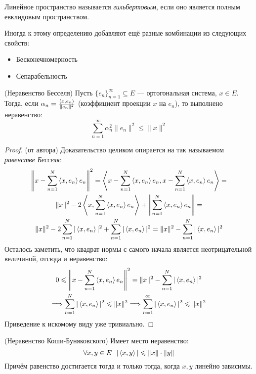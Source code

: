 \begin{definition}
	Линейное пространство называется \textit{гильбертовым}, если оно является полным евклидовым пространством.
\end{definition}

\begin{note}
	Иногда к этому определению добавляют ещё разные комбинации из следующих свойств:
	\begin{itemize}
		\item Бесконечномерность
		
		\item Сепарабельность
	\end{itemize}
\end{note}

\begin{reminder} (Неравенство Бесселя)
	Пусть $\{e_n\}_{n = 1}^\infty \subseteq E$ --- ортогональная система, $x \in E$. Тогда, если $\alpha_n = \frac{\left\langle x, e_n\right\rangle}{\|e_n\|^2}$ (коэффициент проекции $x$ на $e_n$), то выполнено неравенство:
	\[
		\sum_{n = 1}^\infty \alpha_n^2\|e_n\|^2 \le \|x\|^2
	\]
\end{reminder}

\begin{proof} (от автора)
	Доказательство целиком опирается на так называемом \textit{равенстве Бесселя}:
	\begin{multline*}
		\left\|x - \sum_{n = 1}^N \left\langle x, e_n\right\rangle e_n\right\|^2 = \left\langle x - \sum_{n = 1}^N \left\langle x, e_n\right\rangle e_n, x - \sum_{n = 1}^N \left\langle x, e_n\right\rangle e_n\right\rangle =
		\\
		\|x\|^2 - 2\left\langle x, \sum_{n = 1}^N \left\langle x, e_n\right\rangle e_n\right\rangle + \left\|\sum_{n = 1}^N \left\langle x, e_n\right\rangle e_n\right\| =
		\\
		\|x\|^2 - 2\sum_{n = 1}^N |\left\langle x, e_n\right\rangle|^2 + \sum_{n = 1}^N |\left\langle x, e_n\right\rangle|^2 = \|x\|^2 - \sum_{n = 1}^N |\left\langle x, e_n\right\rangle|^2
	\end{multline*}
	Осталось заметить, что квадрат нормы с самого начала является неотрицательной величиной, отсюда и неравенство:
	\begin{multline*}
		0 \leqslant \left\|x - \sum_{n = 1}^N \left\langle x, e_n\right\rangle e_n\right\|^2 = \|x\|^2 - \sum_{n = 1}^N |\left\langle x, e_n\right\rangle|^2
		\\
		\Longrightarrow \sum_{n = 1}^N |\left\langle x, e_n\right\rangle|^2 \leqslant \|x\|^2 \Longrightarrow \sum_{n = 1}^\infty |\left\langle x, e_n\right\rangle|^2 \leqslant \|x\|^2
	\end{multline*}
	Приведение к искомому виду уже тривиально.
\end{proof}

\begin{proposition} (Неравенство Коши-Буняковского)
	Имеет место неравенство:
	\[
		\forall x, y \in E\ \ |\left\langle x, y\right\rangle| \leqslant \|x\| \cdot \|y\|
	\]
	Причём равенство достигается тогда и только тогда, когда $x, y$ линейно зависимы.
\end{proposition}

